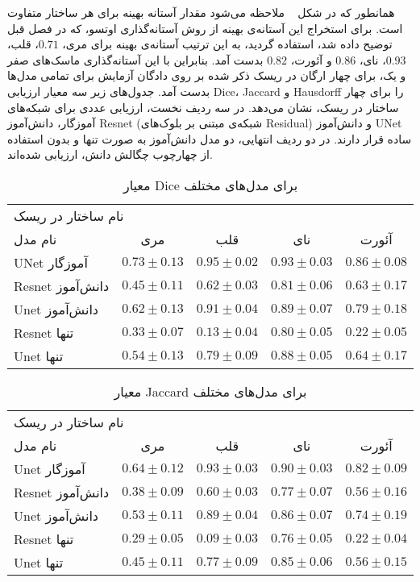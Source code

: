 همانطور که در شکل ~ ملاحظه‌ می‌شود مقدار آستانه بهینه برای هر ساختار متفاوت است. برای استخراج این آستانه‌ی بهینه از روش آستانه‌گذاری اوتسو، که در فصل قبل توضیح داده شد، استفاده گردید، به این ترتیب آستانه‌ی بهینه برای مری، $0.71$، قلب، $0.93$، نای، $0.86$ و آئورت، $0.82$ بدست آمد. بنابراین با این آستانه‌گذاری ماسک‌های صفر و یک، برای چهار ارگان در ریسک ذکر شده بر روی دادگان آزمایش برای تمامی مدل‌ها بدست آمد. جدول‌های زیر سه معیار ارزیابی Dice، Jaccard و Hausdorff را برای چهار ساختار در ریسک، نشان می‌دهد. در سه ردیف نخست، ارزیابی عددی برای شبکه‌های آموزگار، دانش‌آموز Resnet (شبکه‌ی مبتنی بر بلوک‌های Residual) و دانش‌آموز UNet ساده قرار دارند. در دو ردیف انتهایی، دو مدل دانش‌آموز به صورت تنها و بدون استفاده از چهارچوب چگالش دانش‌، ارزیابی شده‌اند.

\begin{table}[H]
	\caption{معیار Dice برای مدل‌های مختلف}
	\label{distilldice}
	\centering
	\begin{tabular}{lcccc}
		\toprule
		\multicolumn{4}{l}{نام ساختار در ریسک} \\
		
		\cmidrule(r){2-5}
		نام مدل & مری & قلب & نای & آئورت \\
		\midrule
		 UNet آموزگار & $0.73 \pm 0.13$ & $0.95 \pm 0.02$ & $0.93 \pm 0.03$ & $0.86 \pm 0.08$\\
		Resnet دانش‌آموز & $0.45 \pm 0.11$ & $0.62 \pm 0.03$ & $0.81 \pm 0.06$ & $0.63 \pm 0.17$ \\
		Unet دانش‌آموز & $0.62 \pm 0.13 $ & $0.91 \pm 0.04$ & $0.89 \pm 0.07 $ & $0.79 \pm 0.18$ \\
		\midrule
		Resnet تنها & $0.33 \pm 0.07 $ & $0.13 \pm 0.04 $ & $0.80 \pm 0.05$ & $0.22 \pm 0.05$ \\
		 Unet تنها & $0.54 \pm 0.13$ & $0.79 \pm 0.09$ & $0.88 \pm 0.05$ & $0.64 \pm 0.17$ \\
		\bottomrule
	\end{tabular}
\end{table}


\begin{table}[H]
	\caption{معیار Jaccard برای مدل‌های مختلف}
	\label{distilljaccard}
	\centering
	\begin{tabular}{lcccc}
		\toprule
		\multicolumn{4}{l}{نام ساختار در ریسک} \\
		
		\cmidrule(r){2-5}
		نام مدل & مری & قلب & نای & آئورت \\
		\midrule
		Unet آموزگار & $0.64 \pm 0.12$ & $0.93 \pm 0.03$ & $0.90 \pm 0.03$ & $0.82 \pm 0.09$\\
		Resnet دانش‌آموز & $0.38 \pm 0.09$ & $0.60 \pm 0.03$ & $0.77 \pm 0.07$ & $0.56 \pm 0.16$ \\
		Unet دانش‌آموز & $0.53 \pm 0.11 $ & $0.89 \pm 0.04$ & $0.86 \pm 0.07 $ & $0.74 \pm 0.19$ \\
		\midrule
		Resnet تنها & $0.29 \pm 0.05 $ & $0.09 \pm 0.03 $ & $0.76 \pm 0.05$ & $0.22 \pm 0.04$ \\
		Unet تنها & $0.45 \pm 0.11$ & $0.77 \pm 0.09$ & $0.85 \pm 0.06$ & $0.56 \pm 0.15$ \\
		\bottomrule
	\end{tabular}
\end{table}

